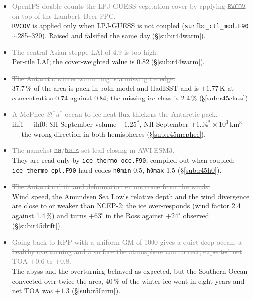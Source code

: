 \documentclass[10pt]{article}
\newcommand{\dead}[1]{\textcolor{gray}{\sout{#1}}}
\begin{document}
\begin{itemize}
\item \dead{OpenIFS double-counts the LPJ-GUESS vegetation cover by applying \texttt{RVCOV} on top of
      the Lambert--Beer FPC.} \\ \texttt{RVCOV} is applied only when LPJ-GUESS is not coupled
      (\texttt{surfbc\_ctl\_mod.F90} ${\sim}$285--320). Raised and falsified the same day
      (\S\ref{sub:r44warm}).

\item \dead{The central Asian steppe LAI of 4.9 is too high.} \\ Per-tile LAI; the cover-weighted
      value is 0.82 (\S\ref{sub:r44warm}).

\item \dead{The Antarctic winter warm ring is a missing ice edge.} \\ 37.7\,\% of the area is pack
      in both model and HadISST and is $+1.77$\,K at concentration 0.74 against 0.84; the
      missing-ice class is 2.4\,\% (\S\ref{sub:r45class}).

\item \dead{A McPhee $St^*u^*$ ocean-to-ice heat flux thickens the Antarctic pack.} \\ ihf1 $-$
      ihf0: SH September volume $-1.25^*$, NH September $+1.04^*\times10^3$\,km$^3$ --- the wrong
      direction in both hemispheres (\S\ref{sub:r45mcphee}).

\item \dead{The namelist \texttt{h0}/\texttt{h0\_s} set lead closing in AWI-ESM3.} \\ They are read
      only by \texttt{ice\_thermo\_oce.F90}, compiled out when coupled; \texttt{ice\_thermo\_cpl.F90}
      hard-codes \texttt{h0min} 0.5, \texttt{h0max} 1.5 (\S\ref{sub:r45h0}).

\item \dead{The Antarctic drift and deformation errors come from the winds.} \\ Wind speed, the
      Amundsen Sea Low's relative depth and the wind divergence are close to or weaker than NCEP-2;
      the ice over-responds (wind factor 2.4 against 1.4\,\%) and turns $+63^\circ$ in the Ross
      against $+24^\circ$ observed (\S\ref{sub:r45drift}).

\item \dead{Going back to KPP with a uniform GM of 1000 gives a quiet deep ocean, a healthy
      overturning and a surface the atmosphere can correct; expected net TOA $+0.6$ to $+0.8$.} \\
      The abyss and the overturning behaved as expected, but the Southern Ocean convected over twice
      the area, 40\,\% of the winter ice went in eight years and net TOA was $+1.3$
      (\S\ref{sub:r50arm}).


\end{itemize}
\end{document}

